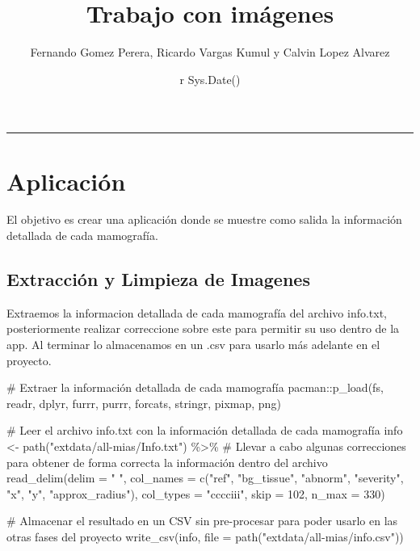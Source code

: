 \documentclass[
]{article}
\title{Trabajo con imágenes}
\author{Fernando Gomez Perera, Ricardo Vargas Kumul y Calvin Lopez
Alvarez}
\date{r Sys.Date()}
\newenvironment{Shaded}{\begin{snugshade}}{\end{snugshade}}
\newcommand{\AttributeTok}[1]{\textcolor[rgb]{0.00,0.34,0.68}{#1}}
\newcommand{\CommentTok}[1]{\textcolor[rgb]{0.54,0.53,0.53}{#1}}
\newcommand{\DecValTok}[1]{\textcolor[rgb]{0.69,0.50,0.00}{#1}}
\newcommand{\FunctionTok}[1]{\textcolor[rgb]{0.39,0.29,0.61}{#1}}
\newcommand{\NormalTok}[1]{\textcolor[rgb]{0.12,0.11,0.11}{#1}}
\newcommand{\OtherTok}[1]{\textcolor[rgb]{0.00,0.43,0.16}{#1}}
\newcommand{\SpecialCharTok}[1]{\textcolor[rgb]{0.24,0.68,0.91}{#1}}
\newcommand{\StringTok}[1]{\textcolor[rgb]{0.75,0.01,0.01}{#1}}
\begin{document}
\maketitle

\begin{center}\rule{0.5\linewidth}{0.5pt}\end{center}

\hypertarget{aplicaciuxf3n}{%
\section{Aplicación}\label{aplicaciuxf3n}}

El objetivo es crear una aplicación donde se muestre como salida la
información detallada de cada mamografía.

\hypertarget{extracciuxf3n-y-limpieza-de-imagenes}{%
\subsection{Extracción y Limpieza de
Imagenes}\label{extracciuxf3n-y-limpieza-de-imagenes}}

Extraemos la informacion detallada de cada mamografía del archivo
info.txt, posteriormente realizar correccione sobre este para permitir
su uso dentro de la app. Al terminar lo almacenamos en un .csv para
usarlo más adelante en el proyecto.

\begin{Shaded}
\begin{Highlighting}[]
\CommentTok{\# Extraer la información detallada de cada mamografía}
\NormalTok{pacman}\SpecialCharTok{::}\FunctionTok{p\_load}\NormalTok{(fs, readr, dplyr, furrr, purrr, forcats, stringr, pixmap, png)}

\CommentTok{\# Leer el archivo info.txt con la información detallada de cada mamografía}
\NormalTok{info }\OtherTok{\textless{}{-}} \FunctionTok{path}\NormalTok{(}\StringTok{"extdata/all{-}mias/Info.txt"}\NormalTok{) }\SpecialCharTok{\%\textgreater{}\%}
  \CommentTok{\# Llevar a cabo algunas correcciones para obtener de forma correcta la información dentro del archivo}
  \FunctionTok{read\_delim}\NormalTok{(}\AttributeTok{delim =} \StringTok{" "}\NormalTok{,}
             \AttributeTok{col\_names =} \FunctionTok{c}\NormalTok{(}\StringTok{"ref"}\NormalTok{, }\StringTok{"bg\_tissue"}\NormalTok{, }\StringTok{"abnorm"}\NormalTok{, }\StringTok{"severity"}\NormalTok{, }\StringTok{"x"}\NormalTok{, }\StringTok{"y"}\NormalTok{, }\StringTok{"approx\_radius"}\NormalTok{),}
             \AttributeTok{col\_types =} \StringTok{"cccciii"}\NormalTok{,}
             \AttributeTok{skip =} \DecValTok{102}\NormalTok{, }\AttributeTok{n\_max =} \DecValTok{330}\NormalTok{)}

\CommentTok{\# Almacenar el resultado en un CSV sin pre{-}procesar para poder usarlo en las otras fases del proyecto}
\FunctionTok{write\_csv}\NormalTok{(info, }\AttributeTok{file =} \FunctionTok{path}\NormalTok{(}\StringTok{"extdata/all{-}mias/info.csv"}\NormalTok{))}
\end{Highlighting}
\end{Shaded}
\end{document}
